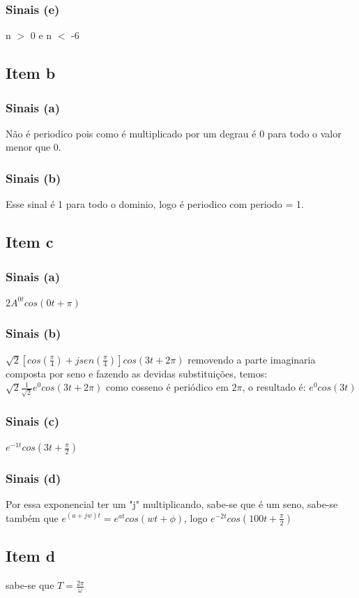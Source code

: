 \documentclass[a4paper, 12pt]{article}
\begin{document}
            \subsubsection{Sinais (e)}
            n $>$ 0 e n $<$ -6
        \subsection{Item b}
            \subsubsection{Sinais (a)}
            N\~ao \'e periodico pois como \'e multiplicado por um degrau \'e 0 para todo o valor menor que 0.
            \subsubsection{Sinais (b)}
            Esse sinal \'e 1 para todo o dominio, logo \'e periodico com periodo = 1.
        \subsection{Item c}
            \subsubsection{Sinais (a)}
            $2A^{0t}cos(0t + \pi)$
            \subsubsection{Sinais (b)}
            $\sqrt{2}[cos(\frac{\pi}{4})+jsen(\frac{\pi}{4})]cos(3t + 2\pi)$ removendo a parte imaginaria composta por seno e fazendo as devidas substituições, temos: $\sqrt{2}\frac{1}{\sqrt{2}}e^{0}cos(3t + 2\pi)$ como cosseno é periódico em $2\pi$, o resultado  é: $e^{0}cos(3t)$
            \subsubsection{Sinais (c)}
            $e^{-1t}cos(3t+\frac{\pi}{2})$
            \subsubsection{Sinais (d)}
            Por essa exponencial ter um "j" multiplicando, sabe-se que é um seno, sabe-se também que $e^{(a+jw)t} = e^{at}cos(wt + \phi)$, logo $e^{-2t}cos(100t + \frac{\pi}{2})$
        \subsection{Item d}
	        sabe-se que $T = \frac{2\pi}{\omega}$
\end{document}
